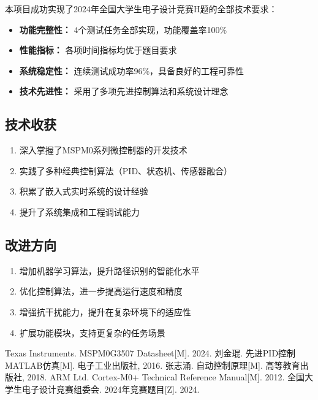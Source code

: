 \documentclass[UTF8]{ctexart}
\begin{document}
本项目成功实现了2024年全国大学生电子设计竞赛H题的全部技术要求：

\begin{itemize}
    \item \textbf{功能完整性：} 4个测试任务全部实现，功能覆盖率100\%
    \item \textbf{性能指标：} 各项时间指标均优于题目要求
    \item \textbf{系统稳定性：} 连续测试成功率96\%，具备良好的工程可靠性
    \item \textbf{技术先进性：} 采用了多项先进控制算法和系统设计理念
\end{itemize}

\subsection{技术收获}

\begin{enumerate}
    \item 深入掌握了MSPM0系列微控制器的开发技术
    \item 实践了多种经典控制算法（PID、状态机、传感器融合）
    \item 积累了嵌入式实时系统的设计经验
    \item 提升了系统集成和工程调试能力
\end{enumerate}

\subsection{改进方向}

\begin{enumerate}
    \item 增加机器学习算法，提升路径识别的智能化水平
    \item 优化控制算法，进一步提高运行速度和精度
    \item 增强抗干扰能力，提升在复杂环境下的适应性
    \item 扩展功能模块，支持更复杂的任务场景
\end{enumerate}

\begin{thebibliography}{99}
     Texas Instruments. MSPM0G3507 Datasheet[M]. 2024.
     刘金琨. 先进PID控制MATLAB仿真[M]. 电子工业出版社, 2016.
     张志涌. 自动控制原理[M]. 高等教育出版社, 2018.
     ARM Ltd. Cortex-M0+ Technical Reference Manual[M]. 2012.
     全国大学生电子设计竞赛组委会. 2024年竞赛题目[Z]. 2024.
\end{thebibliography}
\end{document}
